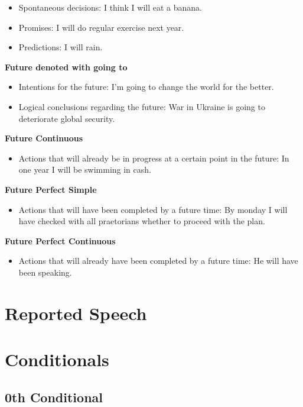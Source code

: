 \documentclass[a4paper,12pt]{report}
\begin{document}
\begin{itemize}
	\item Spontaneous decisions: I think I will eat a banana.
	\item Promises: I will do regular exercise next year.
	\item Predictions: I will rain.
\end{itemize}

\noindent
\textbf{Future denoted with going to}

\begin{itemize}
	\item Intentions for the future: I'm going to change the world for the better.
	\item Logical conclusions regarding the future: War in Ukraine is going to deteriorate global security.
\end{itemize}

\noindent
\textbf{Future Continuous}

\begin{itemize}
	\item Actions that will already be in progress at a certain point in the future: In one year I will be swimming in cash.
\end{itemize}

\noindent
\textbf{Future Perfect Simple}

\begin{itemize}
	\item Actions that will have been completed by a future time: By monday I will have checked with all praetorians whether to proceed with the plan.
\end{itemize}

\noindent
\textbf{Future Perfect Continuous}

\begin{itemize}
	\item Actions that will already have been completed by a future time: He will have been speaking.
\end{itemize}


\section{Reported Speech}

\section{Conditionals}

\subsection{0th Conditional}
\end{document}
